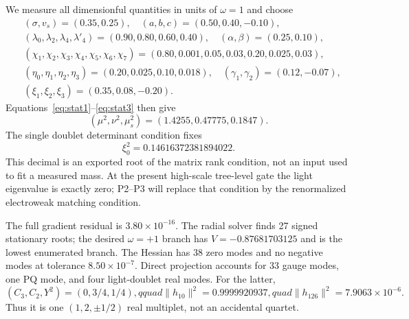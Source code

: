 \documentclass[11pt]{article}
\begin{document}
We measure all dimensionful quantities in units of $\omega=1$ and choose
\begin{align*}
&(\sigma,v_s)=(0.35,0.25),\quad
(a,b,c)=(0.50,0.40,-0.10),\\
&(\lambda_0,\lambda_2,\lambda_4,\lambda'_4)=(0.90,0.80,0.60,0.40),
\quad(\alpha,\beta)=(0.25,0.10),\\
&(\chi_1,\chi_2,\chi_3,\chi_4,\chi_5,\chi_6,\chi_7)
=(0.80,0.001,0.05,0.03,0.20,0.025,0.03),\\
&(\eta_0,\eta_1,\eta_2,\eta_3)=(0.20,0.025,0.10,0.018),
\quad(\gamma_1,\gamma_2)=(0.12,-0.07),\\
&(\xi_1,\xi_2,\xi_3)=(0.35,0.08,-0.20).
\end{align*}
Equations~\eqref{eq:stat1}--\eqref{eq:stat3} then give
\begin{equation}
 (\mu^2,\nu^2,\mu_s^2)=(1.4255,0.47775,0.1847).
\end{equation}
The single doublet determinant condition fixes
\begin{equation}
 \xi_0^2=0.14616372381894022.
\end{equation}
This decimal is an exported root of the matrix rank condition, not an input
used to fit a measured mass.  At the present high-scale tree-level gate the
light eigenvalue is exactly zero; P2--P3 will replace that condition by the
renormalized electroweak matching condition.

The full gradient residual is $3.80\times10^{-16}$.  The radial solver finds
27 signed stationary roots; the desired $\omega=+1$ branch has
$V=-0.87681703125$ and is the lowest enumerated branch.  The Hessian has 38
zero modes and no negative modes at tolerance $8.50\times10^{-7}$.  Direct
projection accounts for 33 gauge modes, one PQ mode, and four light-doublet
real modes.  For the latter,
\begin{equation}
 (C_3,C_2,Y^2)=(0,3/4,1/4),qquad
 \|h_{10}\|^2=0.9999920937,quad
 \|h_{126}\|^2=7.9063\times10^{-6}.
\end{equation}
Thus it is one $(1,2,\pm1/2)$ real multiplet, not an accidental quartet.
\end{document}
